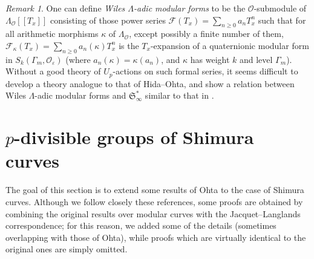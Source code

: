 \documentclass[a4paper,11pt]{amsart}
\numberwithin{equation}{section}
\theoremstyle{plain}
\theoremstyle{definition}
\theoremstyle{remark}
\newtheorem{remark}[theorem]{Remark}
\begin{document}
{\begin{remark}\label{remwiles}
    One can define \emph{Wiles $\Lambda$-adic modular forms} to be the 
    $\mathcal{O}$-submodule of $\Lambda_\mathcal{O}[[T_x]]$ consisting of those power series $\mathcal{F}(T_x)= \sum_{n\geq 0}a_nT_x^n$ such that for all arithmetic morphisms $\kappa$ of $\Lambda_\mathcal{O}$, except possibly a finite number of them, 
    $\mathcal{F}_\kappa(T_x)= \sum_{n\geq 0}a_n(\kappa)T_x^n$ is the $T_x$-expansion of a quaternionic modular form in $S_k(\Gamma_m, \mathcal{O}_\varepsilon)$
 (where $a_n(\kappa)=\kappa(a_n)$, and $\kappa$ has weight $k$ and level $\Gamma_m$). Without a good theory of $U_p$-actions on such formal series, it seems difficult to develop a theory analogue to that of Hida--Ohta, and show a relation between 
 Wiles $\Lambda$-adic modular forms and $\mathfrak{S}_\infty^*$ similar to that in \cite[Theorem 2.3.6]{Ohta-ES}. 
\end{remark}}

\section{$p$-divisible groups of Shimura curves}
The goal of this section is to extend some results of Ohta \cite{Ohta-ES, OhtaC, OhtaMA} to the case of Shimura curves. Although we follow closely these references, some proofs are obtained by combining the original results over modular curves with the Jacquet--Langlands correspondence; for this reason, we added some of the details (sometimes overlapping with those of Ohta), while proofs which are virtually identical to the original ones are simply omitted. 
\end{document}

